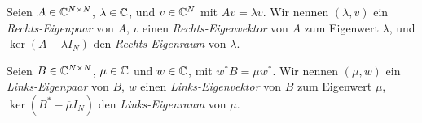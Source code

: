 \begin{definition} \label{def:links_rechts_eigen_}

    Seien $A \in \mathbb{C}^{N \times N}$, $\lambda \in \mathbb{C}$, und $v \in \mathbb{C}^N$ mit $A v = \lambda v$.
    Wir nennen $(\lambda, v)$ ein \textit{Rechts-Eigenpaar} von $A$, $v$ einen \textit{Rechts-Eigenvektor} von $A$ zum Eigenwert $\lambda$, und $\ker (A - \lambda I_N)$ den \textit{Rechts-Eigenraum} von $\lambda$.

    Seien $B \in \mathbb{C}^{N \times N}$, $\mu \in \mathbb{C}$ und $w \in \mathbb{C}$, mit $w^\ast B = \mu w^\ast$.
    Wir nennen $(\mu, w)$ ein \textit{Links-Eigenpaar} von $B$, $w$ einen \textit{Links-Eigenvektor} von $B$ zum Eigenwert $\mu$, $\ker (B^\ast - \overline \mu I_N)$ den \textit{Links-Eigenraum} von $\mu$.

\end{definition}
